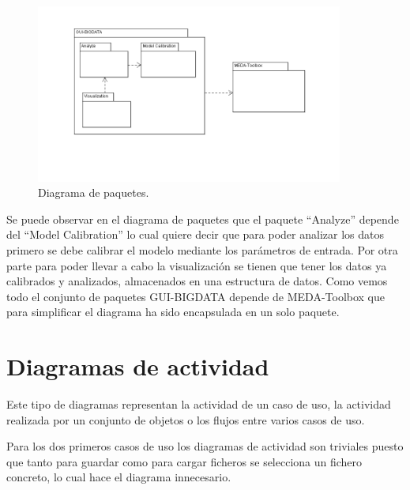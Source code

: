 \begin{figure}[H]
\centering
\includegraphics[width=0.9\textwidth]{imagenes/diagramas/DDP.png}
\caption{Diagrama de paquetes.}
\end{figure}

Se puede observar en el diagrama de paquetes que el paquete “Analyze” depende del “Model Calibration” lo cual quiere decir que para poder analizar los datos primero se debe calibrar el modelo mediante los parámetros de entrada. Por otra parte para poder llevar a cabo la visualización se tienen que tener los datos ya calibrados y analizados,  almacenados en una estructura de datos. Como vemos todo el conjunto de paquetes GUI-BIGDATA depende de MEDA-Toolbox que para simplificar el diagrama ha sido encapsulada en un solo paquete.
\bigskip

\section{Diagramas de actividad}

Este tipo de diagramas representan la actividad de un caso de uso, la actividad realizada por un conjunto de objetos o los flujos entre varios casos de uso.
\bigskip

Para los dos primeros casos de uso los diagramas de actividad son triviales puesto que tanto para guardar como para cargar ficheros se selecciona un fichero concreto, lo cual hace el diagrama innecesario.
\bigskip

